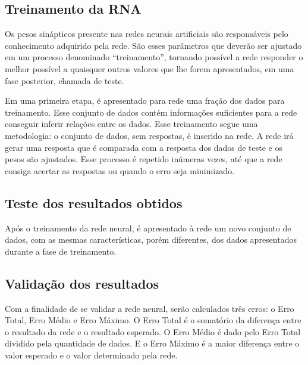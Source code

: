 \subsection{Treinamento da RNA}

Os pesos sinápticos presente nas redes neurais artificiais são responsáveis pelo conhecimento adquirido pela rede. São esses parâmetros que deverão ser ajustado em um processo denominado “treinamento”, tornando possível a rede responder o melhor possível a quaisquer outros valores que lhe forem apresentados, em uma fase posterior, chamada de teste.

Em uma primeira etapa, é apresentado para rede uma fração dos dados para treinamento. Esse conjunto de dados contém informações suficientes para a rede conseguir inferir relações entre os dados. Esse treinamento segue uma metodologia: o conjunto de dados, sem respostas, é inserido na rede. A rede irá gerar uma resposta que é comparada com a resposta dos dados de teste e os pesos são ajustados. Esse processo é repetido inúmeras vezes, até que a rede consiga acertar as respostas ou quando o erro seja minimizado. 

\subsection{Teste dos resultados obtidos}

Após o treinamento da rede neural, é apresentado à rede um novo conjunto de dados, com as mesmas características, porém diferentes, dos dados apresentados durante a fase de treinamento. 

\subsection{Validação dos resultados}

Com a finalidade de se validar a rede neural, serão calculados três erros: o Erro Total, Erro Médio e Erro Máximo. O Erro Total é o somatório da diferença entre o resultado da rede e o resultado esperado. O Erro Médio é dado pelo Erro Total dividido pela quantidade de dados. E o Erro Máximo é a maior diferença entre o valor esperado e o valor determinado pela rede.